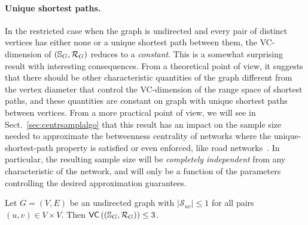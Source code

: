 \paragraph{Unique shortest paths.}\label{sec:centrsamplrangeunique}
In the restricted case when the graph is undirected and
every pair of distinct vertices has either none or a unique shortest path
between them, the VC-dimension of $(\mathbb{S}_G,\mathcal{R}_G)$ reduces %
to a \emph{constant}. This is a somewhat surprising result with interesting
consequences. From a theoretical point of view, it suggests that there should be
other characteristic quantities of the graph different from the vertex diameter
that control the VC-dimension of the range space of shortest paths, and these
quantities are constant on graph with unique shortest paths between vertices.
From a more practical point of view, we will see in
Sect.~\ref{sec:centrsamplalgo} that this result has an impact on the sample size
needed to approximate the betweenness centrality of networks where the
unique-shortest-path property is satisfied or even enforced, like road
networks~\citep{GeisbergerSS08}. In particular, the resulting sample size will
be \emph{completely independent} from any characteristic of the network, and
will only be a function of the parameters controlling the desired approximation
guarantees. 

\begin{lemma}\label{lem:vcdimuppboundunique}
  Let $G=(V,E)$ be an undirected graph with $|\mathcal{S}_{uv}|\le1$ for all
  pairs $(u,v)\in V\times V$. Then $\mathsf{VC}\left((\mathbb{S}_G,\mathcal{R}_G)\right)\le 3$.
\end{lemma}

